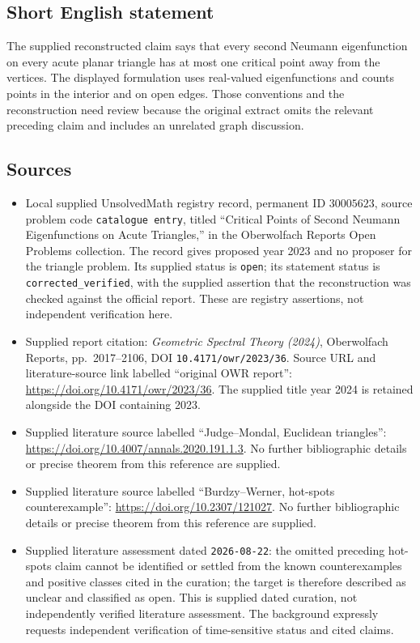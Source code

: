 \documentclass[11pt]{article}
\begin{document}
\subsection{Short English statement}
The supplied reconstructed claim says that every second Neumann eigenfunction on every acute planar triangle has at most one critical point away from the vertices. The displayed formulation uses real-valued eigenfunctions and counts points in the interior and on open edges. Those conventions and the reconstruction need review because the original extract omits the relevant preceding claim and includes an unrelated graph discussion.
\subsection{Sources}
\begin{itemize}
\item Local supplied UnsolvedMath registry record, permanent ID \(30005623\), source problem code \texttt{catalogue entry}, titled ``Critical Points of Second Neumann Eigenfunctions on Acute Triangles,'' in the Oberwolfach Reports Open Problems collection. The record gives proposed year 2023 and no proposer for the triangle problem. Its supplied status is \texttt{open}; its statement status is \texttt{corrected\_verified}, with the supplied assertion that the reconstruction was checked against the official report. These are registry assertions, not independent verification here.
\item Supplied report citation: \emph{Geometric Spectral Theory (2024)}, Oberwolfach Reports, pp.\ 2017--2106, DOI \texttt{10.4171/owr/2023/36}. Source URL and literature-source link labelled ``original OWR report'': \url{https://doi.org/10.4171/owr/2023/36}. The supplied title year 2024 is retained alongside the DOI containing 2023.
\item Supplied literature source labelled ``Judge--Mondal, Euclidean triangles'': \url{https://doi.org/10.4007/annals.2020.191.1.3}. No further bibliographic details or precise theorem from this reference are supplied.
\item Supplied literature source labelled ``Burdzy--Werner, hot-spots counterexample'': \url{https://doi.org/10.2307/121027}. No further bibliographic details or precise theorem from this reference are supplied.
\item Supplied literature assessment dated \texttt{2026-08-22}: the omitted preceding hot-spots claim cannot be identified or settled from the known counterexamples and positive classes cited in the curation; the target is therefore described as unclear and classified as open. This is supplied dated curation, not independently verified literature assessment. The background expressly requests independent verification of time-sensitive status and cited claims.

\end{itemize}
\end{document}
